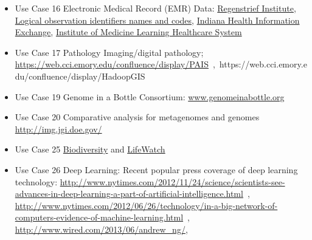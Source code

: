 \begin{itemize}
\item
  Use Case 16 Electronic Medical Record (EMR) Data:
  \href{http://www.regenstrief.org/}{Regenstrief Institute},
  \href{http://loinc.org/}{Logical observation identifiers names and
  codes}, \href{http://www.ihie.org/}{Indiana Health Information
  Exchange},
  \href{http://www.iom.edu/Activities/Quality/LearningHealthcare.aspx}{Institute
  of Medicine Learning Healthcare System}
\item
  Use Case 17 Pathology Imaging/digital pathology;
  \url{https://web.cci.emory.edu/confluence/display/PAIS}~,~https://web.cci.emory.edu/confluence/display/HadoopGIS
\item
  Use Case 19 Genome in a Bottle Consortium:
  \href{https://bigdatacoursespring2015.appspot.com/www.genomeinabottle.org}{www.genomeinabottle.org}
\item
  Use Case 20 Comparative analysis for metagenomes and genomes
  \url{http://img.jgi.doe.gov/}
\item
  Use Case 25
  \href{https://www.biodiversitycatalogue.org/}{Biodiversity} and
  \href{http://www.lifewatch.eu/web/guest/home}{LifeWatch}
\item
  Use Case 26 Deep Learning: Recent popular press coverage of deep
  learning technology:
  \url{http://www.nytimes.com/2012/11/24/science/scientists-see-advances-in-deep-learning-a-part-of-artificial-intelligence.html}~,
  \url{http://www.nytimes.com/2012/06/26/technology/in-a-big-network-of-computers-evidence-of-machine-learning.html}~,
  \url{http://www.wired.com/2013/06/andrew_ng/},~


\end{itemize}
